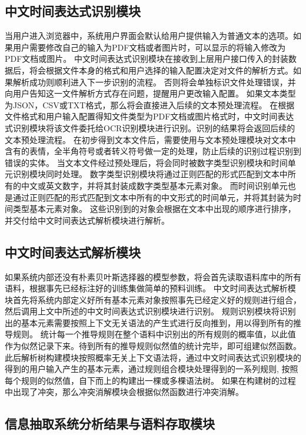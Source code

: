 \subsection{中文时间表达式识别模块}

当用户进入浏览器中，系统用户界面会默认给用户提供输入为普通文本的选项。如果用户需要修改自己的输入为PDF文档或者图片时，可以显示的将输入修改为PDF文档或图片。
中文时间表达式识别模块在接收到上层用户接口传入的封装数据后，将会根据文件本身的格式和用户选择的输入配置决定对文件的解析方式。如果解析成功则顺利进入下一步识别的流程。
否则将会单独标识文件处理错误，并向用户告知这一文件解析方式存在问题，提醒用户更改输入配置。
如果文本类型为JSON，CSV或TXT格式，那么将会直接进入后续的文本预处理流程。
在根据文件格式和用户输入配置得知文件类型为PDF文档或图片格式时，中文时间表达式识别模块将该文件委托给OCR识别模块进行识别。识别的结果将会返回后续的文本预处理流程。
在初步得到文本文件后，需要使用与文本预处理模块对文本中含有的表情，全半角符号或者转义符号做一定的处理，防止后续的识别过程识别到错误的实体。
当文本文件经过预处理后，将会同时被数字类型识别模块和时间单元识别模块同时处理。
数字类型识别模块将通过正则匹配的形式匹配到文本中所有的中文或英文数字，并将其封装成数字类型基本元素对象。
而时间识别单元也是通过正则匹配的形式匹配到文本中所有的中文形式的时间单元，并将其封装为时间类型基本元素对象。
这些识别到的对象会根据在文本中出现的顺序进行排序，并交付给中文时间表达式解析模块进行解析。

\subsection{中文时间表达式解析模块}

如果系统内部还没有朴素贝叶斯选择器的模型参数，将会首先读取语料库中的所有语料，根据事先已经标注好的训练集做简单的预料训练。
中文时间表达式解析模块首先将系统内部定义好所有基本元素对象按照事先已经定义好的规则进行组合，然后调用上文中所述的中文时间表达式识别模块进行识别。
规则识别模块将识别出的基本元素需要按照上下文无关语法的产生式进行反向推到，用以得到所有的推导规则。
统计每一个推导规则在整个语料中识别出的所有规则的概率值，以此值作为似然记录下来。待到所有的推导规则似然值的统计完毕，即可组建似然函数。
此后解析树构建模块按照概率无关上下文语法将，通过中文时间表达式识别模块的得到的用户输入产生的基本元素，通过规则组合模块处理得到的一系列规则,
按照每个规则的似然值，自下而上的构建出一棵或多棵语法树。
如果在构建树的过程中出现了冲突，那么冲突消解模块会根据似然函数进行冲突消解。

\subsection{信息抽取系统分析结果与语料存取模块}

